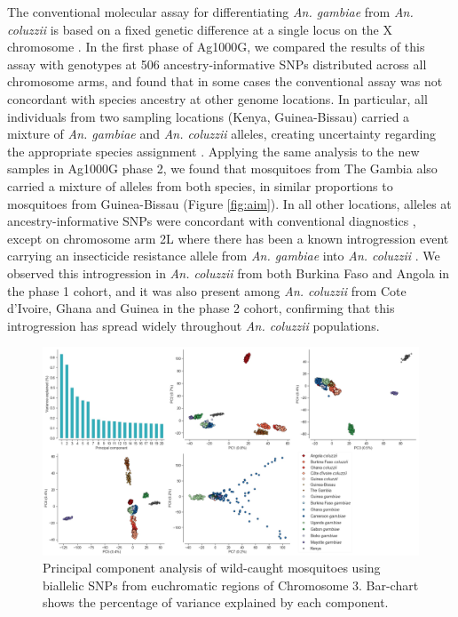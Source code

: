 \documentclass[a4paper,11pt,abstracton,hidelinks]{scrartcl}
\begin{document}
%
The conventional molecular assay for differentiating \textit{An. gambiae} from \textit{An. coluzzii} is based on a fixed genetic difference at a single locus on the X chromosome \cite{santolamazza2008}.
%
In the first phase of Ag1000G, we compared the results of this assay with genotypes at 506 ancestry-informative SNPs distributed across all chromosome arms, and found that in some cases the conventional assay was not concordant with species ancestry at other genome locations.
%
In particular, all individuals from two sampling locations (Kenya, Guinea-Bissau) carried a mixture of \textit{An. gambiae} and \textit{An. coluzzii} alleles, creating uncertainty regarding the appropriate species assignment \cite{Ag1000G2017}. 
%
Applying the same analysis to the new samples in Ag1000G phase 2, we found that mosquitoes from The Gambia also carried a mixture of alleles from both species, in similar proportions to mosquitoes from Guinea-Bissau (Figure \ref{fig:aim}).
%
In all other locations, alleles at ancestry-informative SNPs were concordant with conventional diagnostics \cite{scott1993, fanello2002, santolamazza2008}, except on chromosome arm 2L where there has been a known introgression event carrying an insecticide resistance allele from \textit{An. gambiae} into \textit{An. coluzzii} \cite{weill2000, diabate2004, clarkson2014, norris2015}.
%
We observed this introgression in \textit{An. coluzzii} from both Burkina Faso and Angola in the phase 1 cohort, and it was also present among \textit{An. coluzzii} from Cote d'Ivoire, Ghana and Guinea in the phase 2 cohort, confirming that this introgression has spread widely throughout \textit{An. coluzzii} populations.


\begin{figure}[H]
	\begin{center}
		\includegraphics*[width=6.3in]{artwork/main_pca.jpeg}
	\end{center}
	\caption{Principal component analysis of wild-caught mosquitoes using biallelic SNPs from euchromatic regions of Chromosome 3. Bar-chart shows the percentage of variance explained by each component.}
	\label{fig:pca}
\end{figure}
\end{document}
